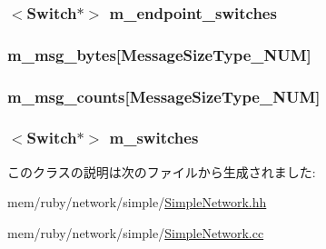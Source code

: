 \label{classSimpleNetwork_a87d1115e90c126f4a0727873d2e9d72d}
\hypertarget{classSimpleNetwork_a4f9f7f675317c0d0aec2f9272b1f4cba}{
\subsubsection[{m\_\-endpoint\_\-switches}]{$<${\bf Switch}$\ast$$>$ {\bf m\_\-endpoint\_\-switches}}}
\label{classSimpleNetwork_a4f9f7f675317c0d0aec2f9272b1f4cba}
\hypertarget{classSimpleNetwork_a88ad01e3ba9f7c20e95be6554a9badd6}{
\subsubsection[{m\_\-msg\_\-bytes}]{ {\bf m\_\-msg\_\-bytes}\mbox{[}MessageSizeType\_\-NUM\mbox{]}}}
\label{classSimpleNetwork_a88ad01e3ba9f7c20e95be6554a9badd6}
\hypertarget{classSimpleNetwork_aab66b83ab5d0c228e10abb19ddbc78f2}{
\subsubsection[{m\_\-msg\_\-counts}]{ {\bf m\_\-msg\_\-counts}\mbox{[}MessageSizeType\_\-NUM\mbox{]}}}
\label{classSimpleNetwork_aab66b83ab5d0c228e10abb19ddbc78f2}
\hypertarget{classSimpleNetwork_a5a28d1a63e9af05191db657b73992dfb}{
\subsubsection[{m\_\-switches}]{$<${\bf Switch}$\ast$$>$ {\bf m\_\-switches}}}
\label{classSimpleNetwork_a5a28d1a63e9af05191db657b73992dfb}


このクラスの説明は次のファイルから生成されました:\begin{DoxyCompactItemize}
\item 
mem/ruby/network/simple/\hyperlink{SimpleNetwork_8hh}{SimpleNetwork.hh}\item 
mem/ruby/network/simple/\hyperlink{SimpleNetwork_8cc}{SimpleNetwork.cc}\end{DoxyCompactItemize}
